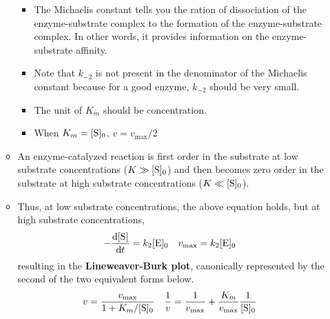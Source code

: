 \documentclass[../notes.tex]{subfiles}
\begin{document}
\begin{itemize}
\begin{itemize}
        \begin{itemize}
            \item The Michaelis constant tells you the ration of dissociation of the enzyme-substrate complex to the formation of the enzyme-substrate complex. In other words, it provides information on the enzyme-substrate affinity.
            \item Note that $k_{-2}$ is not present in the denominator of the Michaelis constant because for a good enzyme, $k_{-2}$ should be very small.
            \item The unit of $K_m$ should be concentration.
            \item When $K_m=\cnc[0]{S}$, $v=v_\text{max}/2$
        \end{itemize}
        \item An enzyme-catalyzed reaction is first order in the substrate at low substrate concentrations ($K\gg\cnc[0]{S}$) and then becomes zero order in the substrate at high substrate concentrations ($K\ll\cnc[0]{S}$).
        \item Thus, at low substrate concentrations, the above equation holds, but at high substrate concentrations,
        \begin{align*}
            -\dv{\cnc{S}}{t} &= k_2\cnc[0]{E}&
            v_\text{max} &= k_2\cnc[0]{E}
        \end{align*}
        resulting in the \textbf{Lineweaver-Burk plot}, canonically represented by the second of the two equivalent forms below.
        \begin{align*}
            v &= \frac{v_\text{max}}{1+K_m/\cnc[0]{S}}&
            \frac{1}{v} &= \frac{1}{v_\text{max}}+\frac{K_m}{v_\text{max}}\frac{1}{\cnc[0]{S}}
        \end{align*}
    \end{itemize}
\end{itemize}
\end{document}
